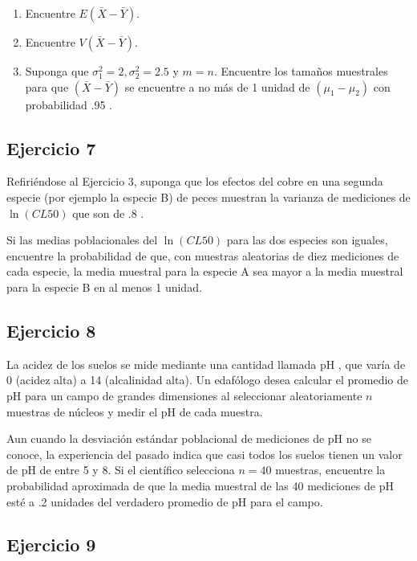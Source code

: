 \documentclass[
]{article}
\providecommand{\tightlist}{%
  \setlength{\itemsep}{0pt}\setlength{\parskip}{0pt}}
\begin{document}
\begin{enumerate}
\def\labelenumi{\alph{enumi}.}
\tightlist
\item
  Encuentre \(E(\bar{X}-\bar{Y})\).
\item
  Encuentre \(V(\bar{X}-\bar{Y})\).
\item
  Suponga que \(\sigma_{1}^{2}=2, \sigma_{2}^{2}=2.5\) y \(m=n\). Encuentre los tamaños muestrales para que \((\bar{X}-\bar{Y})\) se encuentre a no más de 1 unidad de \(\left(\mu_{1}-\mu_{2}\right)\) con probabilidad .95 .
\end{enumerate}

\subsection{Ejercicio 7}\label{ejercicio-7-1}

Refiriéndose al Ejercicio 3, suponga que los efectos del cobre en una segunda especie (por ejemplo la especie B) de peces muestran la varianza de mediciones de \(\ln(CL50)\) que son de .8 .

Si las medias poblacionales del \(\ln(CL50)\) para las dos especies son iguales, encuentre la probabilidad de que, con muestras aleatorias de diez mediciones de cada especie, la media muestral para la especie A sea mayor a la media muestral para la especie B en al menos 1 unidad.

\subsection{Ejercicio 8}\label{ejercicio-8-1}

La acidez de los suelos se mide mediante una cantidad llamada pH , que varía de 0 (acidez alta) a 14 (alcalinidad alta). Un edafólogo desea calcular el promedio de pH para un campo de grandes dimensiones al seleccionar aleatoriamente \(n\) muestras de núcleos y medir el pH de cada muestra.

Aun cuando la desviación estándar poblacional de mediciones de pH no se conoce, la experiencia del pasado indica que casi todos los suelos tienen un valor de pH de entre 5 y 8. Si el científico selecciona \(n=40\) muestras, encuentre la probabilidad aproximada de que la media muestral de las 40 mediciones de pH esté a .2 unidades del verdadero promedio de pH para el campo.

\subsection{Ejercicio 9}\label{ejercicio-9}
\end{document}
